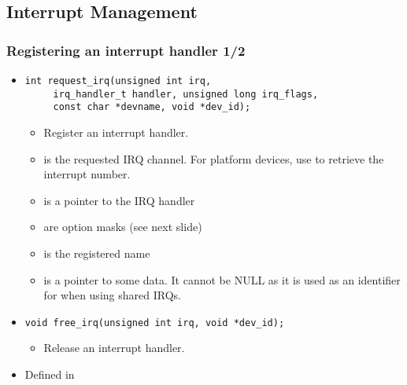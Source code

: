 \subsection{Interrupt Management}

\begin{frame}[fragile]
  \frametitle{Registering an interrupt handler 1/2}
  \begin{itemize}
  \item \begin{verbatim}
int request_irq(unsigned int irq,
     irq_handler_t handler, unsigned long irq_flags,
     const char *devname, void *dev_id);
   \end{verbatim}
   \begin{itemize}
   \item Register an interrupt handler.
   \item {} is the requested IRQ channel. For platform
     devices, use  to retrieve the
     interrupt number.
   \item {} is a pointer to the IRQ handler
   \item {} are option masks (see next slide)
   \item {} is the registered name
   \item {} is a pointer to some data. It cannot be NULL
     as it is used as an identifier for  when using
     shared IRQs.
   \end{itemize}
 \item \begin{verbatim}
void free_irq(unsigned int irq, void *dev_id);
\end{verbatim}
\begin{itemize}
\item Release an interrupt handler.
\end{itemize}
 \item Defined in 
 \end{itemize}
\end{frame}

